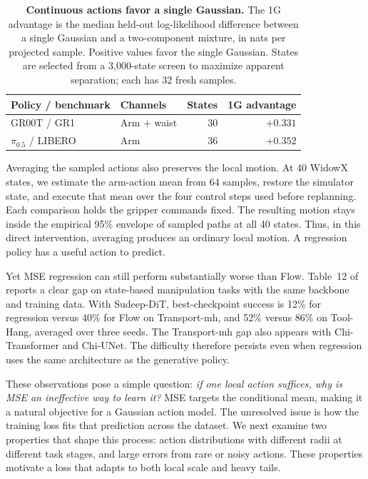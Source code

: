 \begin{table}[ht]
\centering
\caption{\textbf{Continuous actions favor a single Gaussian.}
The 1G advantage is the median held-out log-likelihood difference between a
single Gaussian and a two-component mixture, in nats per projected sample.
Positive values favor the single Gaussian. States are selected from a
3,000-state screen to maximize apparent separation; each has 32 fresh samples.}
\label{tab:single-mode-density}
\begin{tabular}{@{}llrr@{}}
\toprule
Policy / benchmark & Channels & States & 1G advantage \\
\midrule
GR00T / GR1          & Arm $+$ waist & 30 & $+0.331$ \\
$\pi_{0.5}$ / LIBERO & Arm           & 36 & $+0.352$ \\
\bottomrule
\end{tabular}
\end{table}

Averaging the sampled actions also preserves the local motion.
At 40 WidowX states, we estimate the arm-action mean from 64 samples, restore
the simulator state, and execute that mean over the four control steps used
before replanning. Each comparison holds the gripper commands fixed.
The resulting motion stays inside the empirical 95\% envelope of sampled
paths at all 40 states. Thus, in this direct intervention, averaging produces
an ordinary local motion. A regression policy has a useful action to predict.

Yet MSE regression can still perform substantially worse than Flow.
Table~12 of \citet{pan2025muchado} reports a clear gap on state-based
manipulation tasks with the same backbone and training data. With Sudeep-DiT,
best-checkpoint success is 12\% for regression versus 40\% for Flow on
Transport-mh, and 52\% versus 86\% on Tool-Hang, averaged over three seeds.
The Transport-mh gap also appears with Chi-Transformer and Chi-UNet.
The difficulty therefore persists even when regression uses the same
architecture as the generative policy.

These observations pose a simple question:
\emph{if one local action suffices, why is MSE an ineffective way to learn it?}
MSE targets the conditional mean, making it a natural objective for a
Gaussian action model. The unresolved issue is how the training loss fits
that prediction across the dataset. We next examine two properties that
shape this process: action distributions with different radii at different
task stages, and large errors from rare or noisy actions. These properties
motivate a loss that adapts to both local scale and heavy tails.
